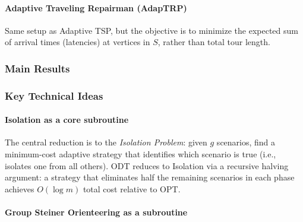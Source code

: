 \paragraph{Adaptive Traveling Repairman (AdapTRP)}

Same setup as Adaptive TSP, but the objective is to minimize the expected sum of arrival times (latencies) at vertices in $S$, rather than total tour length.

\subsubsection{Main Results}

\begin{center}
\end{center}

\subsubsection{Key Technical Ideas}

\paragraph{Isolation as a core subroutine}

The central reduction is to the \emph{Isolation Problem}: given $g$ scenarios, find a minimum-cost adaptive strategy that identifies which scenario is true (i.e., isolates one from all others). ODT reduces to Isolation via a recursive halving argument: a strategy that eliminates half the remaining scenarios in each phase achieves $O(\log m)$ total cost relative to OPT.

\paragraph{Group Steiner Orienteering as a subroutine}

